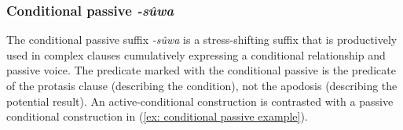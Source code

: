 \ea\label{ex: mediopassive example}

    \z
\z

\subsubsection{Conditional passive \textit{-sûwa}}
\label{subsubsec: conditional passive}

The conditional passive suffix \textit{-sûwa} is a stress-shifting suffix that is productively used in complex clauses cumulatively expressing a conditional relationship and passive voice. The predicate marked with the conditional passive is the predicate of the protasis clause (describing the condition), not the apodosis (describing the potential result). An active-conditional construction is contrasted with a passive conditional construction in (\ref{ex: conditional passive example}).

\ea\label{ex: conditional passive example}

